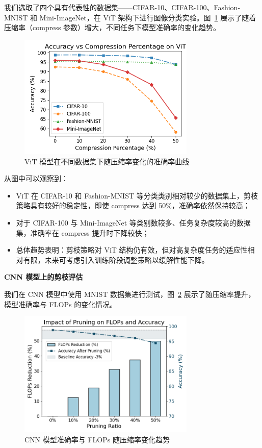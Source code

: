 \documentclass[UTF8,openany]{ctexbook}
\begin{document}
我们选取了四个具有代表性的数据集——CIFAR-10、CIFAR-100、Fashion-MNIST 和 Mini-ImageNet，在 ViT 架构下进行图像分类实验。图~\ref{fig:vit_accuracy_trend} 展示了随着压缩率（compress 参数）增大，不同任务下模型准确率的变化趋势。

\begin{figure}[H]
    \centering
    \includegraphics[width=0.75\textwidth]{img/extendOnVIT.png}
    \caption{ViT 模型在不同数据集下随压缩率变化的准确率曲线}
    \label{fig:vit_accuracy_trend}
\end{figure}

从图中可以观察到：

\begin{itemize}[itemsep=0pt, topsep=0pt, parsep=0pt, partopsep=0pt]
    \item ViT 在 CIFAR-10 和 Fashion-MNIST 等分类类别相对较少的数据集上，剪枝策略具有较好的稳定性，即使 compress 达到 50\%，准确率依然保持较高；
    \item 对于 CIFAR-100 与 Mini-ImageNet 等类别数较多、任务复杂度较高的数据集，准确率在 compress 提升时下降较快；
    \item 总体趋势表明：剪枝策略对 ViT 结构仍有效，但对高复杂度任务的适应性相对有限，未来可考虑引入训练阶段调整策略以缓解性能下降。
\end{itemize}

\noindent\textbf{CNN 模型上的剪枝评估} 

我们在 CNN 模型中使用 MNIST 数据集进行测试，图~\ref{fig:cnn_accuracy_flops} 展示了随压缩率提升，模型准确率与 FLOPs 的变化情况。

\begin{figure}[H]
    \centering
    \includegraphics[width=0.75\textwidth]{img/extendOnCNN.png}
    \caption{CNN 模型准确率与 FLOPs 随压缩率变化趋势}
    \label{fig:cnn_accuracy_flops}
\end{figure}
\end{document}
